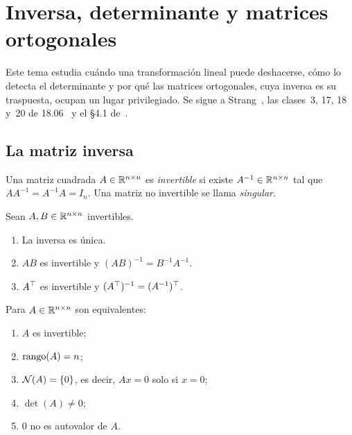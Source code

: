 \chapter{Inversa, determinante y matrices ortogonales}
\label{tema:2}

Este tema estudia cuándo una transformación lineal puede deshacerse, cómo lo detecta el determinante y por qué las matrices ortogonales, cuya inversa es su traspuesta, ocupan un lugar privilegiado. Se sigue a Strang~\cite[§2.2, cap.~5 y §4.4]{strang-ila}, las clases~3, 17, 18 y~20 de 18.06~\cite{mit1806} y el §4.1 de~\cite{mml}.

\section{La matriz inversa}

\begin{definicion}[Inversa]
Una matriz cuadrada $A\in\mathbb{R}^{n\times n}$ es \emph{invertible} si existe $A^{-1}\in\mathbb{R}^{n\times n}$ tal que $AA^{-1}=A^{-1}A=I_n$. Una matriz no invertible se llama \emph{singular}.
\end{definicion}

\begin{proposicion}\label{prop:inversa-props}
Sean $A,B\in\mathbb{R}^{n\times n}$ invertibles.
\begin{enumerate}
  \item La inversa es única.
  \item $AB$ es invertible y $(AB)^{-1}=B^{-1}A^{-1}$.
  \item $A^{\top}$ es invertible y $(A^{\top})^{-1}=(A^{-1})^{\top}$.
\end{enumerate}
\end{proposicion}

\begin{teorema}\label{teo:invertible}
Para $A\in\mathbb{R}^{n\times n}$ son equivalentes:
\begin{enumerate}
  \item $A$ es invertible;
  \item $\operatorname{rango}(A)=n$;
  \item $\mathcal{N}(A)=\{0\}$, es decir, $Ax=0$ solo si $x=0$;
  \item $\det(A)\ne 0$;
  \item $0$ no es autovalor de $A$.
\end{enumerate}
\end{teorema}

